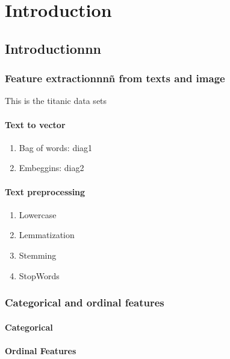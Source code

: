 \documentclass[a4paper,12pt]{book}
\begin{document}
\chapter{Introduction}
\section{Introductionnn}
    \subsection{Feature extractionnnñ from texts and image}

    This is the titanic data sets
        \subsubsection{Text to vector}
            \begin{enumerate}
                
            \item {Bag of words:}
            {diag1}

            \item {Embeggins:}
            {diag2}

            \end{enumerate}
        \subsubsection{Text preprocessing}
            \begin{enumerate}
                \item {Lowercase}
                \item {Lemmatization}
                \item {Stemming}
                \item {StopWords}
            \end{enumerate}

    \subsection{Categorical and ordinal features}
        \subsubsection{Categorical}
        \subsubsection{Ordinal Features}
\end{document}
